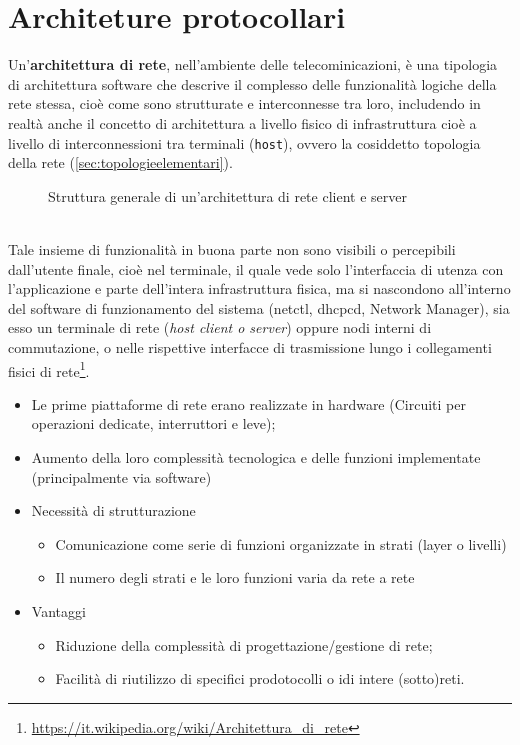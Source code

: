\section{Architeture protocollari}
\label{sec:archprot}

\begin{defi}
  Un'\textbf{architettura di rete}, nell'ambiente delle telecominicazioni, è una tipologia di architettura
  software che descrive il complesso delle funzionalità logiche della rete stessa, cioè come sono strutturate
  e interconnesse tra loro, includendo in realtà anche il concetto di architettura a livello fisico di
  infrastruttura cioè a livello di interconnessioni tra terminali (\texttt{host}), ovvero la cosiddetto
  topologia della rete (\ref{sec:topologieelementari}).
  \begin{figure}[ht!]
    \centering
    
    \caption{Struttura generale di un'architettura di rete client e server}
    \label{fig:stackprotgen}
  \end{figure}\\ 
  Tale insieme di funzionalità in buona parte non sono visibili o percepibili dall'utente finale, cioè nel
  terminale, il quale vede solo l'interfaccia di utenza con l'applicazione e parte dell'intera infrastruttura
  fisica, ma si nascondono all'interno del software di funzionamento del sistema (netctl, dhcpcd, Network
  Manager), sia esso un terminale di rete ({\it host client o server}) oppure nodi interni di commutazione, o
  nelle rispettive interfacce di trasmissione lungo i collegamenti fisici di rete\footnote{\href{https://it.wikipedia.org/wiki/Architettura_di_rete}{https://it.wikipedia.org/wiki/Architettura\_di\_rete}}. 
\end{defi}
\begin{itemize}
\item Le prime piattaforme di rete erano realizzate in hardware (Circuiti per operazioni dedicate, interruttori e
  leve);
\item Aumento della loro complessità tecnologica e delle funzioni implementate (principalmente via software)
\item Necessità di strutturazione
  \begin{itemize}
  \item Comunicazione come serie di funzioni organizzate in strati (layer o livelli)
  \item Il numero degli strati e le loro funzioni varia da rete a rete
  \end{itemize}
\item Vantaggi
  \begin{itemize}
  \item Riduzione della complessità di progettazione/gestione di rete;
  \item Facilità di riutilizzo di specifici prodotocolli o idi intere (sotto)reti.
  \end{itemize}
\end{itemize}
